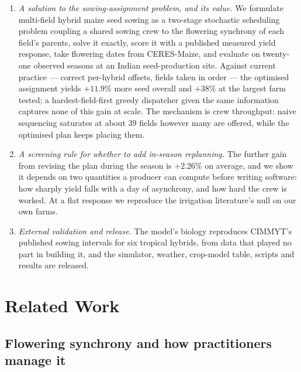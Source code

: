 \documentclass[10pt,twocolumn]{article}
\begin{document}
\begin{enumerate}
\itemsep1pt
\item \emph{A solution to the sowing-assignment problem, and its value.} We
formulate multi-field hybrid maize seed sowing as a two-stage stochastic
scheduling problem coupling a shared sowing crew to the flowering synchrony
of each field's parents, solve it exactly, score it with a published
measured yield response, take flowering dates from CERES-Maize, and
evaluate on twenty-one observed seasons at an Indian seed-production site.
Against current practice --- correct per-hybrid offsets, fields taken in
order --- the optimised assignment yields $+11.9$\% more seed overall and
$+38$\% at the largest farm tested; a hardest-field-first greedy dispatcher given the same information captures none of this gain at scale. The mechanism is crew
throughput: naive sequencing saturates at about 39 fields however
many are offered, while the optimised plan keeps placing them.
\item \emph{A screening rule for whether to add in-season replanning.} The
further gain from revising the plan during the season is $+2.26$\% on
average, and we show it depends on two quantities a producer can compute
before writing software: how sharply yield falls with a day of asynchrony,
and how hard the crew is worked. At a flat response we reproduce the
irrigation literature's null on our own farms.
\item \emph{External validation and release.} The model's biology
reproduces CIMMYT's published sowing intervals for six tropical hybrids,
from data that played no part in building it, and the simulator, weather,
crop-model table, scripts and results are released.
\end{enumerate}

\section{Related Work}
\label{sec:related}

\subsection{Flowering synchrony and how practitioners manage it}
\end{document}
